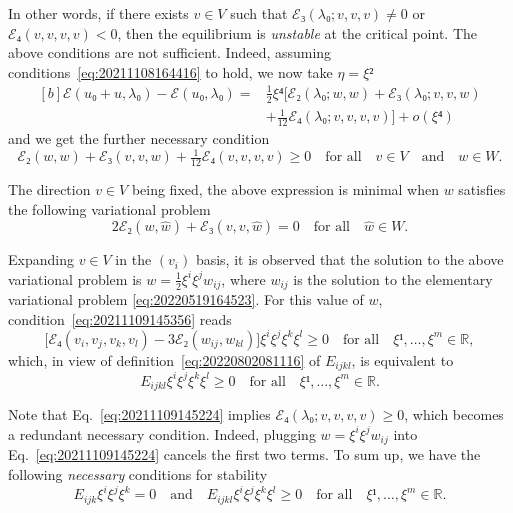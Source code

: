 \documentclass[12pt, final]{scrartcl}
\theoremstyle{definition}
\newcommand{\reals}{\mathbb{R}}
\begin{document}
In other words, if there exists \(v ∈ V\) such that \(ℰ₃(λ₀; v, v, v) \neq 0\)
or \(ℰ₄(v, v, v, v) < 0\), then the equilibrium is \emph{unstable} at the
critical point. The above conditions are not sufficient. Indeed, assuming
conditions~\eqref{eq:20211108164416} to hold, we now take \(η = ξ²\)
\begin{equation}
  \begin{aligned}[b]
    ℰ(u₀ + u, λ₀) - ℰ(u₀, λ₀) ={} & \tfrac{1}{2} ξ⁴ \bigl[ ℰ₂(λ₀; w, w) + ℰ₃(λ₀; v, v, w)\\
    & + \tfrac{1}{12} ℰ₄(λ₀; v, v, v, v) \bigr] + o(ξ⁴)
  \end{aligned}
\end{equation}
and we get the further necessary condition
\begin{equation}
  \label{eq:20211109145356}
  ℰ₂(w, w) + ℰ₃(v, v, w) + \tfrac{1}{12} ℰ₄(v, v, v, v) \geq 0 \quad \text{for all} \quad v ∈ V \quad \text{and} \quad w ∈ W.
\end{equation}

The direction \(v∈V\) being fixed, the above expression is minimal when \(w\)
satisfies the following variational problem
\begin{equation}
  \label{eq:20211109145224}
  2ℰ₂(w, \hat{w}) +ℰ₃(v, v, \hat{w}) = 0 \quad \text{for all} \quad \hat{w}∈W.
\end{equation}

Expanding \(v ∈ V\) in the \((v_i)\) basis, it is observed that the solution to
the above variational problem is \(w = \tfrac{1}{2} ξ^i ξ^j w_{ij}\), where
\(w_{ij}\) is the solution to the elementary variational problem
\eqref{eq:20220519164523}. For this value of \(w\),
condition~\eqref{eq:20211109145356} reads
\begin{equation}
  \bigl[ℰ₄(v_i, v_j, v_k, v_l) - 3ℰ₂(w_{ij}, w_{kl})\bigr] ξ^i ξ^j ξ^k ξ^l \geq 0 \quad \text{for all} \quad ξ¹, \ldots, ξ^m ∈ \reals,
\end{equation}
which, in view of definition~\eqref{eq:20220802081116} of \(E_{ijkl}\), is equivalent to
\begin{equation}
  E_{ijkl} ξ^i ξ^j ξ^k ξ^l \geq 0 \quad \text{for all} \quad ξ¹, \ldots, ξ^m ∈ \reals.
\end{equation}

Note that Eq.~\eqref{eq:20211109145224} implies \(ℰ₄(λ₀; v, v, v, v) ≥ 0\),
which becomes a redundant necessary condition. Indeed, plugging
\(w= ξ^i ξ^j w_{ij}\) into Eq.~\eqref{eq:20211109145224} cancels the first two
terms. To sum up, we have the following \emph{necessary} conditions for
stability
\begin{equation}
  E_{ijk} ξ^i ξ^j ξ^k = 0 \quad \text{and} \quad E_{ijkl} ξ^i ξ^j ξ^k ξ^l ≥ 0 \quad \text{for all} \quad ξ¹, \ldots, ξ^m ∈ \reals.
\end{equation}
\end{document}
